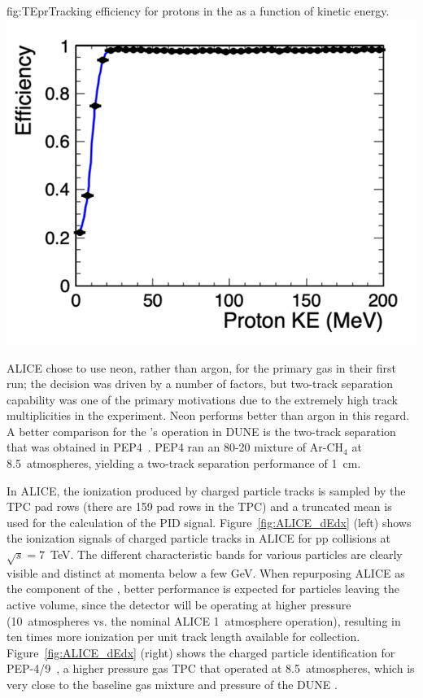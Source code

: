 \begin{dunefigure}{fig:TEpr}{Tracking efficiency for protons in the  as a function of kinetic energy.} 
\includegraphics[width=0.65\columnwidth]{graphics/effvske.png} 
\end{dunefigure}

ALICE chose to use neon, rather than argon, for the primary gas in their first run; the decision was driven by a number of factors, but two-track separation capability was one of the primary motivations due to the extremely high track multiplicities in the experiment.  Neon performs better than argon in this regard.  A better comparison for the 's operation in DUNE is the two-track separation that was obtained in PEP4~\cite{PEP4_Stork}.  PEP4 ran an 80-20 mixture of Ar-CH$_4$ at 8.5~atmospheres, yielding a two-track separation performance of \SI{1}{cm}.

In ALICE, the ionization produced by charged particle tracks is sampled by the TPC pad rows (there are 159 pad rows in the TPC) and a truncated mean is used for the calculation of the PID signal. Figure~\ref{fig:ALICE_dEdx} (left) shows the ionization signals of charged particle tracks in ALICE for pp collisions at $\sqrt{s} = 7$~TeV. The different characteristic bands for various particles are clearly visible and distinct at momenta below a few GeV.  When repurposing ALICE as the  component of the ,  better performance is expected for particles leaving the active volume, since the detector will be operating at higher pressure (10~atmospheres vs. the nominal ALICE 1~atmosphere operation), resulting in ten times more ionization per unit track length available for collection. Figure~\ref{fig:ALICE_dEdx} (right) shows the charged particle identification for PEP-4/9~\cite{Grupen:1999by}, a higher pressure gas TPC that operated at 8.5~atmospheres, which is very close to the baseline gas mixture and pressure of the DUNE .

